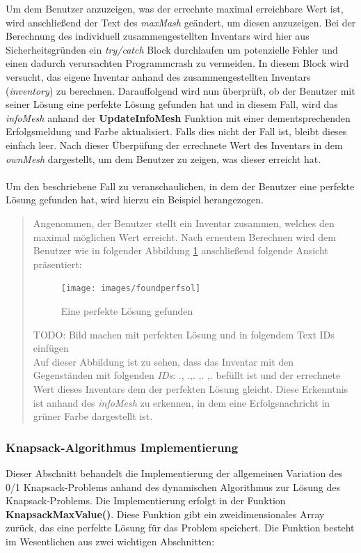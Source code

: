 Um dem Benutzer anzuzeigen, was der errechnte maximal erreichbare Wert ist, wird anschließend der Text des \textit{maxMash}
geändert, um diesen anzuzeigen. Bei der Berechnung des individuell zusammengestellten Inventars wird hier aus Sicherheitsgründen
ein \textit{try/catch} Block durchlaufen um potenzielle Fehler und einen dadurch verursachten Programmcrash zu vermeiden.
In diesem Block wird versucht, das eigene Inventar anhand des zusammengestellten Inventars (\textit{inventory}) zu berechnen.
Darauffolgend wird nun überprüft, ob der Benutzer mit seiner Lösung eine perfekte Lösung gefunden hat und in diesem Fall,
wird das \textit{infoMesh} anhand der \textbf{UpdateInfoMesh} Funktion mit einer dementsprechenden Erfolgsmeldung und Farbe
aktualisiert. Falls dies nicht der Fall ist, bleibt dieses einfach leer. Nach dieser Überpüfung der errechnete Wert des
Inventars in dem \textit{ownMesh} dargestellt, um dem Benutzer zu zeigen, was dieser erreicht hat.
\\
\\
Um den beschriebene Fall zu veranschaulichen, in dem der Benutzer eine perfekte Lösung gefunden hat, wird hierzu ein Beispiel
herangezogen.

\begin{quote}
Angenommen, der Benutzer stellt ein Inventar zusammen, welches den maximal möglichen Wert erreicht. Nach erneutem Berechnen
wird dem Benutzer wie in folgender Abbildung \ref{fig:foundperfsol} anschließend folgende Ansicht präsentiert:
\begin{figure}[H]
    \centering
    \texttt{[image: images/foundperfsol]}
    \caption{Eine perfekte Lösung gefunden}
    \label{fig:foundperfsol}
\end{figure}
TODO: Bild machen mit perfekten Lösung und in folgendem Text IDs einfügen\\
Auf dieser Abbildung ist zu sehen, dass das Inventar mit den Gegenständen mit folgenden \textit{IDs}: ., .,. ,. ,. befüllt
ist und der errechnete Wert dieses Inventars dem der perfekten Lösung gleicht. Diese Erkenntnis ist anhand des \textit{infoMesh}
zu erkennen, in dem eine Erfolgsnachricht in grüner Farbe dargestellt ist.
\end{quote}

\subsubsection{Knapsack-Algorithmus Implementierung}
Dieser Abschnitt behandelt die Implementierung der allgemeinen Variation des 0/1 Knapsack-Problems anhand des dynamischen
Algorithmus zur Lösung des Knapsack-Problems. Die Implementierung erfolgt in der Funktion \textbf{KnapsackMaxValue()}.
Diese Funktion gibt ein zweidimensionales Array zurück, das eine perfekte Lösung für das Problem speichert. Die Funktion
besteht im Wesentlichen aus zwei wichtigen Abschnitten:

